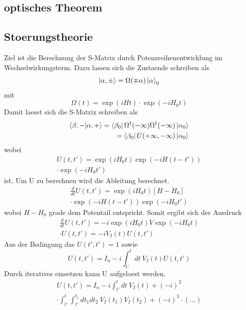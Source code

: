 \documentclass[11pt,a4paper,twocolumn]{article}
\begin{document}
\subsection{optisches Theorem}
\subsection{Stoerungstheorie}
Ziel ist die Berechnung der S-Matrix durch Potenzreihenentwicklung im Wechselwirkungsterm.
Dazu lassen sich die Zustaende schreiben als 
\begin{equation}
		\ket{\alpha, \pm} = \Omega(\mp \alpha)\ket{\alpha}_0
\end{equation}
mit 
\begin{equation}
		\Omega(t) = \exp(iHt) \cdot \exp(-iH_0t)
\end{equation}
Damit laesst sich die S-Matrix schreiben als 
\begin{eqnarray}
		\bra{\beta, -}\ket{\alpha, +} = \bra{\beta_0} \Omega^{\dag}(- \infty)
		\Omega^{\dag}(- \infty) \ket{\alpha_0}\\
		= \bra{\beta_0} U(+\infty, -\infty) \ket{\alpha_0}
\end{eqnarray}
wobei 
\begin{equation}
		\begin{split}
				U(t,t') = \exp(iH_0t) \exp(-iH(t-t')) \\ \cdot \exp(-iH_0t')
		\end{split}
\end{equation}
ist. Um U zu berechnen wird die Ableitung berechnet.
\begin{equation}
		\begin{split}
				\frac{d}{dt} U(t,t') = \exp(iH_0t) [H-H_0] \\ \cdot \exp(-iH(t-t')) \exp(-iH_0t')
		\end{split}
\end{equation}
wobei $H-H_0$ grade dem Potentail entspricht. Somit ergibt sich der Ausdruck
\begin{equation}
		\begin{split}
				\frac{d}{dt} U(t,t') = -i \exp(iH_0t) V \exp(-iH_0t) \\ 
				\cdot U(t, t') = -i V_I(t) U(t,t')
		\end{split}
\end{equation}
Aus der Bedingung das $U(t',t')=1$ sowie 
\begin{equation}
		U(t,t') = I_n -i\int^t_{t'} dt \ V_I(t)U(t,t')
\end{equation}
Durch iteratives einsetzen kann U aufgeloest werden. \begin{equation}
		\begin{split}
				U(t,t') = I_n -i\int^t_{t'} dt \ V_I(t) + (-i)^2 \\ \cdot \int^t_{t'}
				\int^{t_1}_{t'} dt_1 dt_2 \ V_I(t_1) V_I(t_2) + (-i)^3 \cdot (...)
		\end{split}
\end{equation}
\end{document}
